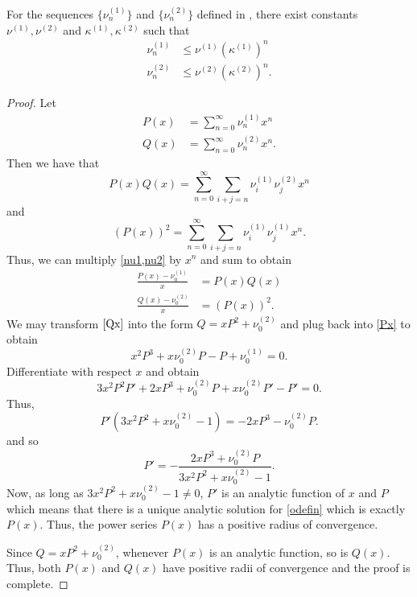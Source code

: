 \documentclass[a4paper, 12pt]{article}
\begin{document}
\begin{lem}
	For the sequences $\{ \nu_{n}^{(1)} \}$ and $\{ \nu_{n}^{(2)} \}$ defined in , there exist constants $\nu^{(1)},\nu^{(2)}$ and $\kappa^{(1)}, \kappa^{(2)}$ such that
	\begin{align}
		\label{convg1}\nu_{n}^{(1)} &\le \nu^{(1)} \left( \kappa^{(1)} \right)^{n}\\
		\label{convg2}\nu_{n}^{(2)} &\le \nu^{(2)} \left( \kappa^{(2)} \right)^{n}
	.\end{align} 

\end{lem}
\begin{proof}
	Let
	\begin{align*}
		P\left( x \right) &= \sum_{n=0}^{\infty} \nu_{n}^{(1)}x^{n} \\
		Q\left( x \right) &= \sum_{n=0}^{\infty} \nu_{n}^{(2)}x^{n}
	.\end{align*}
	Then we have that
	\[
	P\left( x \right) Q\left( x \right) = \sum_{n=0}^{\infty} \sum_{i + j = n}^{} \nu_{i}^{(1)}\nu_{j}^{(2)}x^{n}
	\] 
	and 
	\[
		\left( P\left( x \right) \right) ^2
		= \sum_{n=0}^{\infty} \sum_{i + j = n} \nu_{i}^{(1)}\nu_{j}^{(1)}x^{n}
	.\] 
Thus, we can multiply \cref{nu1,nu2} by $x^{n}$ and sum to obtain
\begin{align}
	\label{Px}\frac{P\left( x \right) -\nu_0^{(1)}}{x} &= P\left( x \right) Q\left( x \right)  \\
	\label{Qx}\frac{Q\left( x \right) -\nu_0^{(2)}}{x} &= \left(P\left( x \right)\right)^2
.\end{align}
We may transform $\cref{Qx}$ into the form $Q= x P^2 + \nu_0^{(2)}$ and plug back into \cref{Px} to obtain
\[
x^2P^3+ x\nu_0^{(2)}P- P +\nu_0^{(1)} = 0
.\] 
Differentiate with respect $x$ and obtain
\[
3x^2P^2P' + 2xP^3 + \nu_0^{(2)}P + x\nu_0^{(2)}P' - P' = 0
.\] 
Thus,
\[
P'\left(3x^2P^2+ x\nu_0^{(2)}-1\right) = -2xP^3 - \nu_0^{(2)}P
.\] 
and so
\begin{equation}\label{odefin}
P' = -\frac{2xP^3 + \nu_0^{(2)}P}{3x^2P^2 + x\nu_0^{(2)}- 1}
.\end{equation} 
Now, as long as $3x^2P^2 + x\nu_0^{(2)}- 1 \neq 0$, $P'$ is an analytic function of $x$ and $P$ which means that there is a unique analytic solution for \cref{odefin} which is exactly $P\left( x \right)$. 
Thus, the power series $P\left( x \right) $ has a positive radius of convergence.

Since $Q = xP^2+ \nu_0^{(2)}$, whenever $P\left( x \right) $ is an analytic function, so is $Q\left( x \right)$.
Thus, both $P\left( x \right)$ and $Q\left( x \right)$ have positive radii of convergence and the proof is complete.
\end{proof}
\end{document}
